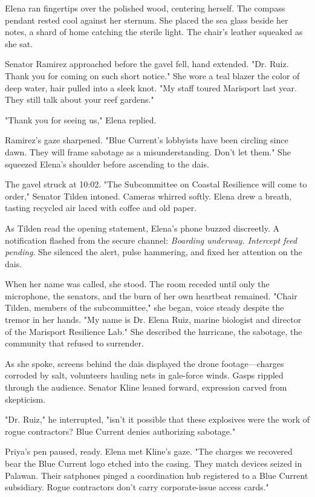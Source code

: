Elena ran fingertips over the polished wood, centering herself. The compass pendant rested cool against her sternum. She placed the sea glass beside her notes, a shard of home catching the sterile light. The chair's leather squeaked as she sat.

Senator Ramirez approached before the gavel fell, hand extended. "Dr. Ruiz. Thank you for coming on such short notice." She wore a teal blazer the color of deep water, hair pulled into a sleek knot. "My staff toured Marisport last year. They still talk about your reef gardens."

"Thank you for seeing us," Elena replied.

Ramirez's gaze sharpened. "Blue Current's lobbyists have been circling since dawn. They will frame sabotage as a misunderstanding. Don't let them." She squeezed Elena's shoulder before ascending to the dais.

The gavel struck at 10:02. "The Subcommittee on Coastal Resilience will come to order," Senator Tilden intoned. Cameras whirred softly. Elena drew a breath, tasting recycled air laced with coffee and old paper.

As Tilden read the opening statement, Elena's phone buzzed discreetly. A notification flashed from the secure channel: \textit{Boarding underway. Intercept feed pending}. She silenced the alert, pulse hammering, and fixed her attention on the dais.

When her name was called, she stood. The room receded until only the microphone, the senators, and the burn of her own heartbeat remained. "Chair Tilden, members of the subcommittee," she began, voice steady despite the tremor in her hands. "My name is Dr. Elena Ruiz, marine biologist and director of the Marisport Resilience Lab." She described the hurricane, the sabotage, the community that refused to surrender.

As she spoke, screens behind the dais displayed the drone footage—charges corroded by salt, volunteers hauling nets in gale-force winds. Gasps rippled through the audience. Senator Kline leaned forward, expression carved from skepticism.

"Dr. Ruiz," he interrupted, "isn't it possible that these explosives were the work of rogue contractors? Blue Current denies authorizing sabotage."

Priya's pen paused, ready. Elena met Kline's gaze. "The charges we recovered bear the Blue Current logo etched into the casing. They match devices seized in Palawan. Their satphones pinged a coordination hub registered to a Blue Current subsidiary. Rogue contractors don't carry corporate-issue access cards."

